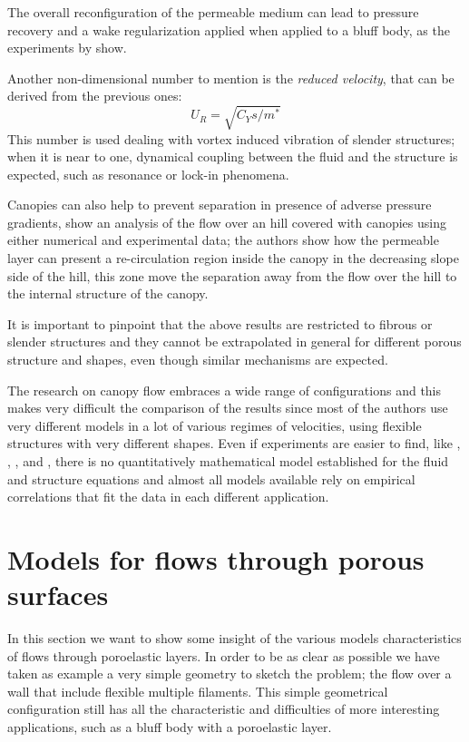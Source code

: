 The overall reconfiguration of the permeable medium can lead to pressure recovery and a wake regularization applied when applied to a bluff body, as the experiments by \citet{gosselin2011drag} show.

Another non-dimensional number to mention is the \textit{reduced velocity}, that can be derived from the previous ones:
$$ U_R = \sqrt{C_Y s / m^*}$$
This number is used dealing with vortex induced vibration of slender structures; when it is near to one, dynamical coupling between the fluid and the structure is expected, such as resonance or lock-in phenomena.

Canopies can also help to prevent separation in presence of adverse pressure gradients, \citet{belcher2012wind} show an analysis of the flow over an hill covered with canopies using either numerical and experimental data; the authors show how the permeable layer can present a re-circulation region inside the canopy in the decreasing slope side of the hill, this zone move the separation away from the flow over the hill to the internal structure of the canopy.

It is important to pinpoint that the above results are restricted to fibrous or slender structures and they cannot be extrapolated in general for different porous structure and shapes, even though similar mechanisms are expected.

The research on canopy flow embraces a wide range of configurations and this makes very difficult the comparison of the results since most of the authors use very different models in a lot of various regimes of velocities, using flexible structures with very different shapes.
Even if experiments are easier to find, like \citet{segalini2011experimental}, \citet{segalini2013scaling}, \citet{maza2013coupled}, \citet{barsu2016drag} and \citet{alvarado2017nature}, there is no quantitatively mathematical model established for the fluid and structure equations and almost all models available rely on empirical correlations that fit the data in each different application.


\section{Models for flows through porous surfaces}
\label{ch:model_porous}

In this section we want to show some insight of the various models characteristics of flows through poroelastic layers.
In order to be as clear as possible we have taken as example a very simple geometry to sketch the problem; the flow over a wall that include flexible multiple filaments. 
This simple geometrical configuration still has all the characteristic and difficulties of more interesting applications, such as a bluff body with a poroelastic layer.

